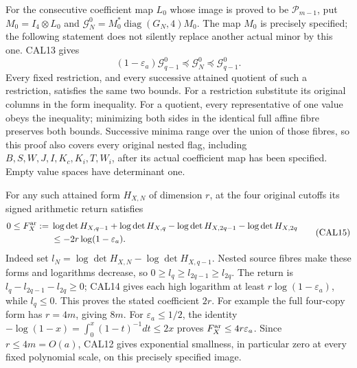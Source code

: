 \documentclass[11pt,a4paper]{article}
\begin{document}
For the consecutive coefficient map $L_0$ whose image is proved
to be $\mathcal P_{m-1}$, put $M_0=I_4\otimes L_0$ and
$\mathcal G_N^0=M_0^*\operatorname{diag}(G_N,4)M_0$.
The map $M_0$ is precisely specified; the following statement does
not silently replace another actual minor by this one.
CAL13 gives
\[
 (1-\varepsilon_a)\mathcal G_{q-1}^0
       \preceq\mathcal G_N^0\preceq\mathcal G_{q-1}^0.
 \tag{CAL14}
\]
Every fixed restriction, and every successive attained quotient of
such a restriction, satisfies the same two bounds. For a restriction
substitute its original columns in the form inequality. For a
quotient, every representative of one value obeys the inequality;
minimizing both sides in the identical full affine fibre preserves
both bounds. Successive minima range over the union of those fibres,
so this proof also covers every original nested flag, including
$B,S,W,J,I,K_c,K_i,T,W_i$, after its actual coefficient map has
been specified. Empty value spaces have determinant one.

For any such attained form $H_{X,N}$ of dimension $r$, at the four
original cutoffs its signed arithmetic return satisfies
\[
 \begin{split}
 0\le F_X^{\rm ar}:={}&
 \log\det H_{X,q-1}+\log\det H_{X,q}
 -\log\det H_{X,2q-1}-\log\det H_{X,2q}\\
 &\le-2r\log(1-\varepsilon_a).
 \end{split}                                                     \tag{CAL15}
\]
Indeed set $l_N=\log\det H_{X,N}-\log\det H_{X,q-1}$.
Nested source fibres make these forms and logarithms decrease,
so $0\ge l_q\ge l_{2q-1}\ge l_{2q}$. The return is
$l_q-l_{2q-1}-l_{2q}\ge0$; CAL14 gives each high logarithm
at least $r\log(1-\varepsilon_a)$, while $l_q\le0$.
This proves the stated coefficient $2r$.
For example the full four-copy form has $r=4m$, giving $8m$.
For $\varepsilon_a\le1/2$, the identity
$-\log(1-x)=\int_0^x(1-t)^{-1}dt\le2x$ proves
$F_X^{\rm ar}\le4r\varepsilon_a$. Since $r\le4m=O(a)$,
CAL12 gives exponential smallness, in particular zero at every
fixed polynomial scale, on this precisely specified image.
\end{document}
